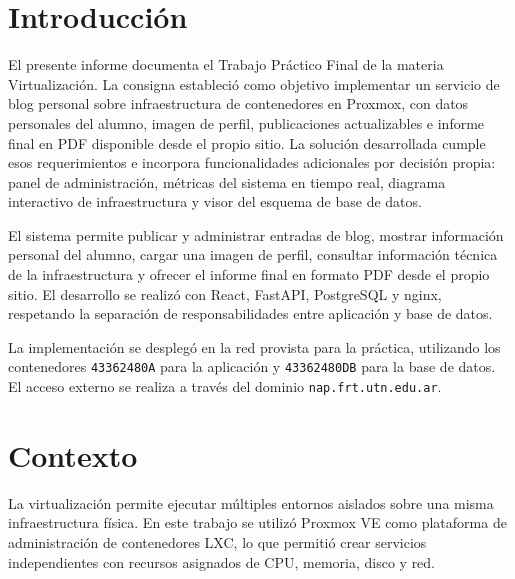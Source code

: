 \documentclass[twoside, 11pt, a4paper]{article}
\begin{document}
    \captionsetup[figure]{labelformat=empty}


    


    \newpage

    \tableofcontents
    \newpage

    \section{Introducción}

    El presente informe documenta el Trabajo Práctico Final de la materia Virtualización. La consigna estableció como objetivo implementar un servicio de blog personal sobre infraestructura de contenedores en Proxmox, con datos personales del alumno, imagen de perfil, publicaciones actualizables e informe final en PDF disponible desde el propio sitio. La solución desarrollada cumple esos requerimientos e incorpora funcionalidades adicionales por decisión propia: panel de administración, métricas del sistema en tiempo real, diagrama interactivo de infraestructura y visor del esquema de base de datos.

    El sistema permite publicar y administrar entradas de blog, mostrar información personal del alumno, cargar una imagen de perfil, consultar información técnica de la infraestructura y ofrecer el informe final en formato PDF desde el propio sitio. El desarrollo se realizó con React, FastAPI, PostgreSQL y nginx, respetando la separación de responsabilidades entre aplicación y base de datos.

    La implementación se desplegó en la red provista para la práctica, utilizando los contenedores \texttt{43362480A} para la aplicación y \texttt{43362480DB} para la base de datos. El acceso externo se realiza a través del dominio \texttt{nap.frt.utn.edu.ar}.

    \section{Contexto}

    La virtualización permite ejecutar múltiples entornos aislados sobre una misma infraestructura física. En este trabajo se utilizó Proxmox VE como plataforma de administración de contenedores LXC, lo que permitió crear servicios independientes con recursos asignados de CPU, memoria, disco y red.
\end{document}
